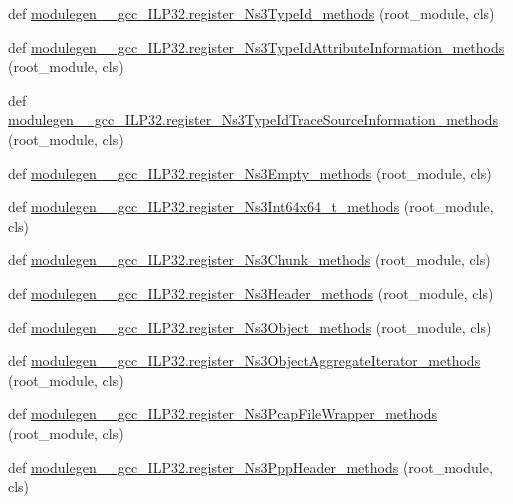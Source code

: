 \begin{DoxyCompactItemize}
def \hyperlink{namespacemodulegen____gcc__ILP32_a6436195ea7813af4a6f5611bac15066d}{modulegen\+\_\+\+\_\+gcc\+\_\+\+I\+L\+P32.\+register\+\_\+\+Ns3\+Type\+Id\+\_\+methods} (root\+\_\+module, cls)
\item 
def \hyperlink{namespacemodulegen____gcc__ILP32_afa4c5c57202d38b0cdfa0d7fd58b5797}{modulegen\+\_\+\+\_\+gcc\+\_\+\+I\+L\+P32.\+register\+\_\+\+Ns3\+Type\+Id\+Attribute\+Information\+\_\+methods} (root\+\_\+module, cls)
\item 
def \hyperlink{namespacemodulegen____gcc__ILP32_a839bc77808351c50cde37c45869c9ac2}{modulegen\+\_\+\+\_\+gcc\+\_\+\+I\+L\+P32.\+register\+\_\+\+Ns3\+Type\+Id\+Trace\+Source\+Information\+\_\+methods} (root\+\_\+module, cls)
\item 
def \hyperlink{namespacemodulegen____gcc__ILP32_aaaf5b4399b80410455abaa6263f1cd29}{modulegen\+\_\+\+\_\+gcc\+\_\+\+I\+L\+P32.\+register\+\_\+\+Ns3\+Empty\+\_\+methods} (root\+\_\+module, cls)
\item 
def \hyperlink{namespacemodulegen____gcc__ILP32_a162a098f5d929c52ad2e6c3ed1f54204}{modulegen\+\_\+\+\_\+gcc\+\_\+\+I\+L\+P32.\+register\+\_\+\+Ns3\+Int64x64\+\_\+t\+\_\+methods} (root\+\_\+module, cls)
\item 
def \hyperlink{namespacemodulegen____gcc__ILP32_acca0b09c03a65420f803907cd64df814}{modulegen\+\_\+\+\_\+gcc\+\_\+\+I\+L\+P32.\+register\+\_\+\+Ns3\+Chunk\+\_\+methods} (root\+\_\+module, cls)
\item 
def \hyperlink{namespacemodulegen____gcc__ILP32_aa49e4221854466e73c3442d993373495}{modulegen\+\_\+\+\_\+gcc\+\_\+\+I\+L\+P32.\+register\+\_\+\+Ns3\+Header\+\_\+methods} (root\+\_\+module, cls)
\item 
def \hyperlink{namespacemodulegen____gcc__ILP32_a214a6e153873bc8ca6880fc3f4cb4cb0}{modulegen\+\_\+\+\_\+gcc\+\_\+\+I\+L\+P32.\+register\+\_\+\+Ns3\+Object\+\_\+methods} (root\+\_\+module, cls)
\item 
def \hyperlink{namespacemodulegen____gcc__ILP32_aa803b137018709bb9ce4e0561d4ce0c7}{modulegen\+\_\+\+\_\+gcc\+\_\+\+I\+L\+P32.\+register\+\_\+\+Ns3\+Object\+Aggregate\+Iterator\+\_\+methods} (root\+\_\+module, cls)
\item 
def \hyperlink{namespacemodulegen____gcc__ILP32_a098ccd45f3d1d9022ed87c5c0f7d7099}{modulegen\+\_\+\+\_\+gcc\+\_\+\+I\+L\+P32.\+register\+\_\+\+Ns3\+Pcap\+File\+Wrapper\+\_\+methods} (root\+\_\+module, cls)
\item 
def \hyperlink{namespacemodulegen____gcc__ILP32_af58f6a45d47c4841fdfd56f968fc8f8e}{modulegen\+\_\+\+\_\+gcc\+\_\+\+I\+L\+P32.\+register\+\_\+\+Ns3\+Ppp\+Header\+\_\+methods} (root\+\_\+module, cls)

\end{DoxyCompactItemize}
